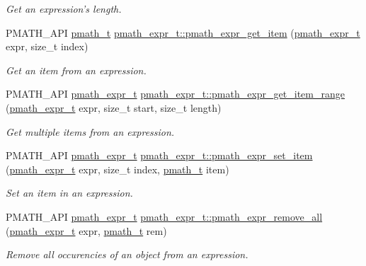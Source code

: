 \begin{CompactItemize}
\begin{CompactList}\small\item\em Get an expression's length. \item\end{CompactList}\item 
PMATH\_\-API \hyperlink{classpmath__t}{pmath\_\-t} \hyperlink{group__expressions_g70b7099d22d00d94f52df167b4e42364}{pmath\_\-expr\_\-t::pmath\_\-expr\_\-get\_\-item} (\hyperlink{classpmath__expr__t}{pmath\_\-expr\_\-t} expr, size\_\-t index)
\begin{CompactList}\small\item\em Get an item from an expression. \item\end{CompactList}\item 
PMATH\_\-API \hyperlink{classpmath__expr__t}{pmath\_\-expr\_\-t} \hyperlink{group__expressions_ga3ba4e55b5e454f569c7e131653d5b14}{pmath\_\-expr\_\-t::pmath\_\-expr\_\-get\_\-item\_\-range} (\hyperlink{classpmath__expr__t}{pmath\_\-expr\_\-t} expr, size\_\-t start, size\_\-t length)
\begin{CompactList}\small\item\em Get multiple items from an expression. \item\end{CompactList}\item 
PMATH\_\-API \hyperlink{classpmath__expr__t}{pmath\_\-expr\_\-t} \hyperlink{group__expressions_g2771a8ad79e108e60df5dbe3ea9c7bf8}{pmath\_\-expr\_\-t::pmath\_\-expr\_\-set\_\-item} (\hyperlink{classpmath__expr__t}{pmath\_\-expr\_\-t} expr, size\_\-t index, \hyperlink{classpmath__t}{pmath\_\-t} item)
\begin{CompactList}\small\item\em Set an item in an expression. \item\end{CompactList}\item 
PMATH\_\-API \hyperlink{classpmath__expr__t}{pmath\_\-expr\_\-t} \hyperlink{group__expressions_g639d7a67fe8b892667b00acc2504b474}{pmath\_\-expr\_\-t::pmath\_\-expr\_\-remove\_\-all} (\hyperlink{classpmath__expr__t}{pmath\_\-expr\_\-t} expr, \hyperlink{classpmath__t}{pmath\_\-t} rem)
\begin{CompactList}\small\item\em Remove all occurencies of an object from an expression. \item\end{CompactList}\item 

\end{CompactItemize}
